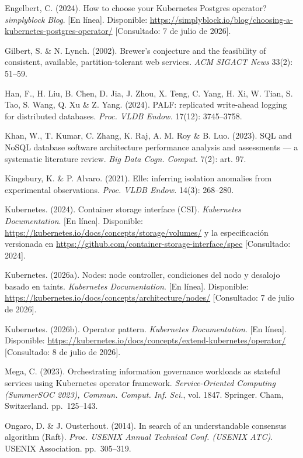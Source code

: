 \documentclass[12pt,twocolumn,letterpaper]{article}
\begin{document}
Engelbert, C. (2024). How to choose your Kubernetes Postgres operator? \textit{simplyblock Blog}. [En línea]. Disponible: \url{https://simplyblock.io/blog/choosing-a-kubernetes-postgres-operator/} [Consultado: 7 de julio de 2026].\par
Gilbert, S. \& N. Lynch. (2002). Brewer's conjecture and the feasibility of consistent, available, partition-tolerant web services. \textit{ACM SIGACT News} 33(2): 51--59.\par
Han, F., H. Liu, B. Chen, D. Jia, J. Zhou, X. Teng, C. Yang, H. Xi, W. Tian, S. Tao, S. Wang, Q. Xu \& Z. Yang. (2024). PALF: replicated write-ahead logging for distributed databases. \textit{Proc. VLDB Endow.} 17(12): 3745--3758.\par
Khan, W., T. Kumar, C. Zhang, K. Raj, A. M. Roy \& B. Luo. (2023). SQL and NoSQL database software architecture performance analysis and assessments --- a systematic literature review. \textit{Big Data Cogn. Comput.} 7(2): art. 97.\par
Kingsbury, K. \& P. Alvaro. (2021). Elle: inferring isolation anomalies from experimental observations. \textit{Proc. VLDB Endow.} 14(3): 268--280.\par
Kubernetes. (2024). Container storage interface (CSI). \textit{Kubernetes Documentation}. [En línea]. Disponible: \url{https://kubernetes.io/docs/concepts/storage/volumes/} y la especificación versionada en \url{https://github.com/container-storage-interface/spec} [Consultado: 2024].\par
Kubernetes. (2026a). Nodes: node controller, condiciones del nodo y desalojo basado en taints. \textit{Kubernetes Documentation}. [En línea]. Disponible: \url{https://kubernetes.io/docs/concepts/architecture/nodes/} [Consultado: 7 de julio de 2026].\par
Kubernetes. (2026b). Operator pattern. \textit{Kubernetes Documentation}. [En línea]. Disponible: \url{https://kubernetes.io/docs/concepts/extend-kubernetes/operator/} [Consultado: 8 de julio de 2026].\par
Mega, C. (2023). Orchestrating information governance workloads as stateful services using Kubernetes operator framework. \textit{Service-Oriented Computing (SummerSOC 2023), Commun. Comput. Inf. Sci.}, vol. 1847. Springer. Cham, Switzerland. pp.~125--143.\par
Ongaro, D. \& J. Ousterhout. (2014). In search of an understandable consensus algorithm (Raft). \textit{Proc. USENIX Annual Technical Conf. (USENIX ATC)}. USENIX Association. pp.~305--319.\par
\end{document}
